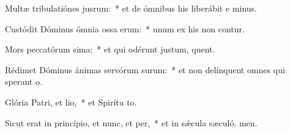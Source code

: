 \item Multæ tribulatiónes jusrum:~* et de ómnibus his liberábit e minus.
\item Custódit Dóminus ómnia ossa erum:~* unum ex his non contur.
\item Mors peccatórum sima:~* et qui odérunt justum, quent.
\item Rédimet Dóminus ánimas servórum surum:~* et non delínquent omnes qui sperant  o.
\item Glória Patri, et lio,~* et Spirítu to.
\item Sicut erat in princípio, et nunc, et per,~* et in sǽcula sæculó. men.
